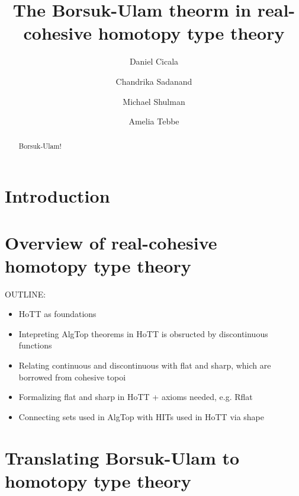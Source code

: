 \documentclass{amsart}
\begin{document}
\title{%
        The Borsuk-Ulam theorm in real-cohesive homotopy
        type theory}   
\author{%
        Daniel Cicala \and Chandrika Sadanand \and Michael
        Shulman \and Amelia Tebbe}
\begin{abstract}
        Borsuk-Ulam!
\end{abstract}
\maketitle

\section{Introduction}
\label{sec:intro}

\section{Overview of real-cohesive homotopy type theory}
\label{sec:rc-hott}

OUTLINE:
\begin{itemize}
\item
  HoTT as foundations
\item
  Intepreting AlgTop theorems in HoTT is obsructed by
  discontinuous functions
\item
  Relating continuous and discontinuous with flat and
  sharp, which are borrowed from cohesive topoi
\item
  Formalizing flat and sharp in HoTT + axioms needed,
  e.g. Rflat
\item
  Connecting sets used in AlgTop with HITs used in HoTT
  via shape
\end{itemize}


\section{Translating Borsuk-Ulam to homotopy type theory}
\label{sec:bu-to-hott}
\end{document}
